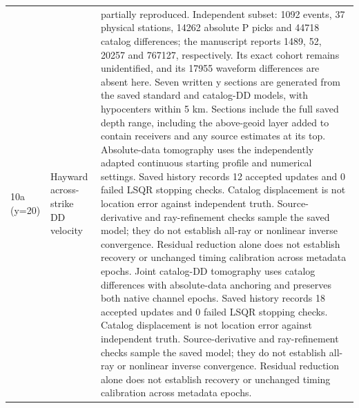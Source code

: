 \begin{longtable}{>{\raggedright\arraybackslash}p{}>{\raggedright\arraybackslash}p{}>{\raggedright\arraybackslash}p{}}
10a (y=20) & Hayward across-strike DD velocity & partially reproduced. Independent subset: 1092 events, 37 physical stations, 14262 absolute P picks and 44718 catalog differences; the manuscript reports 1489, 52, 20257 and 767127, respectively. Its exact cohort remains unidentified, and its 17955 waveform differences are absent here. Seven written y sections are generated from the saved standard and catalog-DD models, with hypocenters within 5 km. Sections include the full saved depth range, including the above-geoid layer added to contain receivers and any source estimates at its top. Absolute-data tomography uses the independently adapted continuous starting profile and numerical settings. Saved history records 12 accepted updates and 0 failed LSQR stopping checks. Catalog displacement is not location error against independent truth. Source-derivative and ray-refinement checks sample the saved model; they do not establish all-ray or nonlinear inverse convergence. Residual reduction alone does not establish recovery or unchanged timing calibration across metadata epochs. Joint catalog-DD tomography uses catalog differences with absolute-data anchoring and preserves both native channel epochs. Saved history records 18 accepted updates and 0 failed LSQR stopping checks. Catalog displacement is not location error against independent truth. Source-derivative and ray-refinement checks sample the saved model; they do not establish all-ray or nonlinear inverse convergence. Residual reduction alone does not establish recovery or unchanged timing calibration across metadata epochs.\\

\end{longtable}
